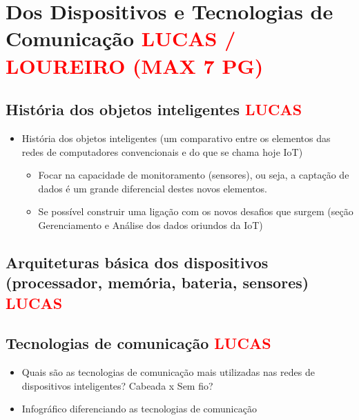 
\section{Dos Dispositivos e Tecnologias de Comunicação 
\textcolor{red}{LUCAS / LOUREIRO (MAX 7 PG)}}
\label{sec:ddtc}

  \subsection{História dos objetos inteligentes \textcolor{red}{LUCAS}}
    \begin{itemize}
      \item História dos objetos inteligentes (um comparativo entre os 
elementos das redes de computadores convencionais e do que se chama hoje IoT) 

      \begin{itemize}
	\item Focar na capacidade de monitoramento (sensores), ou seja, a 
captação de dados é um grande diferencial destes novos elementos.
	\item Se possível construir uma ligação com os novos desafios que 
surgem 
  (seção Gerenciamento e Análise dos dados oriundos da IoT)
      \end{itemize}
    \end{itemize}
  
  \subsection{Arquiteturas básica dos dispositivos (processador, memória, 
bateria, sensores) \textcolor{red}{LUCAS}}
    
  \subsection{Tecnologias de comunicação \textcolor{red}{LUCAS}}
      \begin{itemize}
	\item Quais são as tecnologias de comunicação mais utilizadas nas 
redes   de dispositivos inteligentes? Cabeada x Sem fio?
	\item Infográfico diferenciando as tecnologias de comunicação
      \end{itemize}
  
